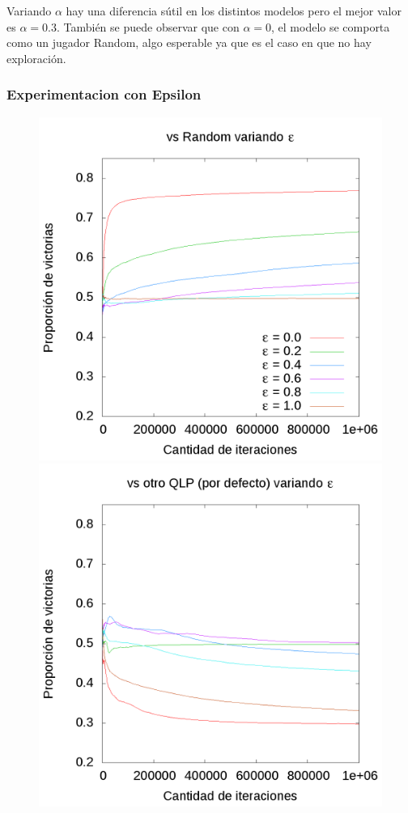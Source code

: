 \documentclass[10pt, a4paper]{article}
\begin{document}
Variando $\alpha$ hay una diferencia sútil en los distintos modelos pero el mejor valor es $\alpha=0.3$. También se puede observar que con $\alpha=0$, el modelo se comporta como un jugador Random, algo esperable ya que es el caso en que no hay exploración.

\subsubsection{Experimentacion con Epsilon}

\begin{figure}[H]
  \begin{minipage}[c]{1\textwidth}
	\includegraphics[scale=0.2]{EpsilonR.png}
	\includegraphics[scale=0.2]{EpsilonQ.png}
  \end{minipage}
\end{figure}
\end{document}

